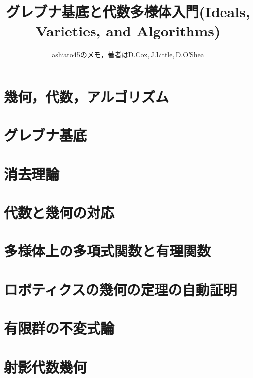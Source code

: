 \documentclass[9pt]{ltjsarticle}
\title{グレブナ基底と代数多様体入門(Ideals, Varieties, and Algorithms)}
\author{ashiato45のメモ，著者はD.Cox,\,J.Little,\,D.O'Shea}
\begin{document}
\maketitle


\section{幾何，代数，アルゴリズム}
%


\section{グレブナ基底}
% 


\section{消去理論}
%

\section{代数と幾何の対応}
%

\section{多様体上の多項式関数と有理関数}
%

\section{ロボティクスの幾何の定理の自動証明}
\label{sec:ロボティクスの幾何の定理の自動証明}

\section{有限群の不変式論}
%

\section{射影代数幾何}

\end{document}
